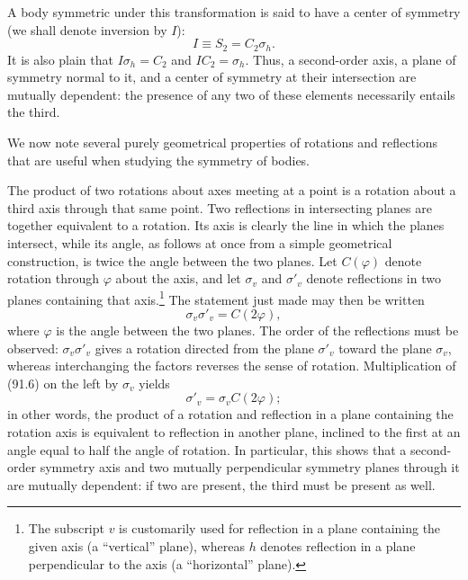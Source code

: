A body symmetric under this transformation is said to have a center of symmetry (we shall denote inversion by $I$):
\begin{equation}
I\equiv S_2=C_2\sigma_h.
\tag{91.5}
\end{equation}
It is also plain that $I\sigma_h=C_2$ and $IC_2=\sigma_h$. Thus, a second-order axis, a plane of symmetry normal to it, and a center of symmetry at their intersection are mutually dependent: the presence of any two of these elements necessarily entails the third.

We now note several purely geometrical properties of rotations and reflections that are useful when studying the symmetry of bodies.

The product of two rotations about axes meeting at a point is a rotation about a third axis through that same point. Two reflections in intersecting planes are together equivalent to a rotation. Its axis is clearly the line in which the planes intersect, while its angle, as follows at once from a simple geometrical construction, is twice the angle between the two planes. Let $C(\varphi)$ denote rotation through $\varphi$ about the axis, and let $\sigma_v$ and $\sigma'_v$ denote reflections in two planes containing that axis.\footnote{The subscript $v$ is customarily used for reflection in a plane containing the given axis (a ``vertical'' plane), whereas $h$ denotes reflection in a plane perpendicular to the axis (a ``horizontal'' plane).} The statement just made may then be written
\begin{equation}
\sigma_v\sigma'_v=C(2\varphi),
\tag{91.6}
\end{equation}
where $\varphi$ is the angle between the two planes. The order of the reflections must be observed: $\sigma_v\sigma'_v$ gives a rotation directed from the plane $\sigma'_v$ toward the plane $\sigma_v$, whereas interchanging the factors reverses the sense of rotation. Multiplication of (91.6) on the left by $\sigma_v$ yields
\begin{equation}
\sigma'_v=\sigma_vC(2\varphi);
\tag{91.7}
\end{equation}
in other words, the product of a rotation and reflection in a plane containing the rotation axis is equivalent to reflection in another plane, inclined to the first at an angle equal to half the angle of rotation. In particular, this shows that a second-order symmetry axis and two mutually perpendicular symmetry planes through it are mutually dependent: if two are present, the third must be present as well.

